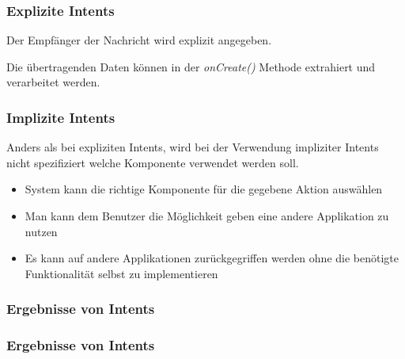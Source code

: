 \begin{frame}[label=explizit_intents]
   \frametitle{Explizite Intents}
   Der Empfänger der Nachricht wird explizit angegeben.

   
   
   Die übertragenden Daten können in der \emph{onCreate()} Methode extrahiert 
   und verarbeitet werden.

   
\end{frame}

\begin{frame}[label=implizit_intents]
   \frametitle{Implizite Intents}
   Anders als bei expliziten Intents, wird bei der Verwendung impliziter Intents 
   nicht spezifiziert welche Komponente verwendet werden soll.

   
   
   \begin{itemize}
      \item System kann die richtige Komponente für die gegebene Aktion auswählen
      \item Man kann dem Benutzer die Möglichkeit geben eine andere Applikation zu nutzen
      \item Es kann auf andere Applikationen zurückgegriffen werden ohne die
         benötigte Funktionalität selbst zu implementieren
   \end{itemize}
\end{frame}

\begin{frame}
   \frametitle{Ergebnisse von Intents}
   
   

   
\end{frame}

\begin{frame}
   \frametitle{Ergebnisse von Intents}
   
\end{frame}

